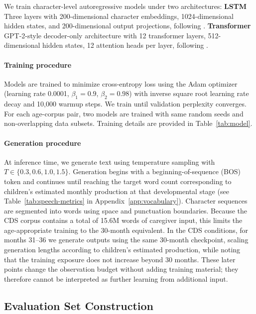We train character-level autoregressive models under two architectures: \textbf{LSTM} Three layers with 200-dimensional character embeddings, 1024-dimensional hidden states, and 200-dimensional output projections, following \citet{lavechin2023babyslm}. \textbf{Transformer} GPT-2-style decoder-only architecture with 12 transformer layers, 512-dimensional hidden states, 12 attention heads per layer, following \citet{goriely2024babble}. 


\paragraph{Training procedure} Models are trained to minimize cross-entropy loss using the Adam optimizer (learning rate 0.0001, $\beta_1=0.9$, $\beta_2=0.98$) with inverse square root learning rate decay and 10,000 warmup steps. We train until validation perplexity converges. For each age-corpus pair, two models are trained with same random seeds and non-overlapping data subsets. Training details are provided in Table~\ref{tab:model}.


\paragraph{Generation procedure} At inference time, we generate text using temperature sampling with $T \in \{0.3, 0.6, 1.0, 1.5\}$. Generation begins with a beginning-of-sequence (BOS) token and continues until reaching the target word count corresponding to children's estimated monthly production at that developmental stage (see Table~\ref{tab:speech-metrics} in Appendix~\ref{app:vocabulary}). Character sequences are segmented into words using space and punctuation boundaries. Because the CDS corpus contains a total of 15.6M words of caregiver input, this limits the age-appropriate training to the 30-month equivalent. In the CDS conditions, for months 31–36 we generate outputs using the same 30-month checkpoint, scaling generation lengths according to children’s estimated production, while noting that the training exposure does not increase beyond 30 months. These later points change the observation budget without adding training material; they therefore cannot be interpreted as further learning from additional input.


\subsection{Evaluation Set Construction} \label{sec:eval_construction}
